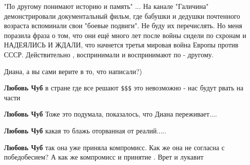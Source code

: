 \begin{itemize}
"По другому понимают историю и память" ... На канале "Галичина" демонстрировали
документальный фильм, где бабушки и дедушки почтенного возраста вспоминали свои
"боевые подвиги". Не буду их перечислять. Но меня поразила фраза о том, что они
ещё много лет после войны сидели по схронам и НАДЕЯЛИСЬ И ЖДАЛИ, что начнется
третья мировая война Европы против СССР. Действительно , воспринимали и
воспринимают по - другому.


 
Диана, а вы сами верите в то, что написали?)

\begin{itemize}
 
\textbf{Любовь Чуб} в стране где все решают \verb|$$$| это невозможно - нас будут рвать на части

 
\textbf{Любовь Чуб} Тоже это подумала, показалось, что Диана переживает....

 
\textbf{Любовь Чуб} какая то блажь оторванная от реалий.....

 
\textbf{Любовь Чуб} так она уже приняла компромисс. Как же она не согласна с победобесием? А как же компромисс и принятие . Врет и лукавит


\end{itemize}
\end{itemize}
